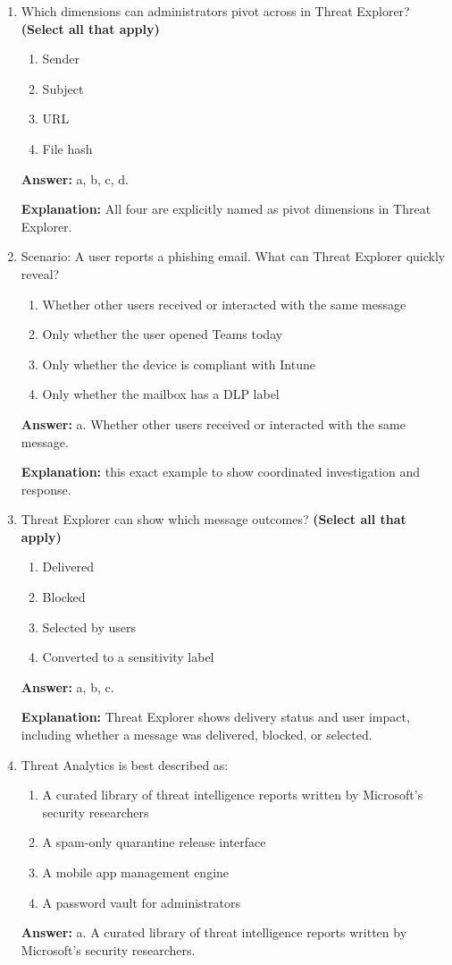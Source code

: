 \documentclass[10pt]{article}
\begin{document}
\begin{enumerate}[leftmargin=*]
\item Which dimensions can administrators pivot across in Threat Explorer? \textbf{(Select all that apply)}
\begin{enumerate}[label=\alph*., leftmargin=1.5em]
\item Sender
\item Subject
\item URL
\item File hash
\end{enumerate}
\textbf{Answer:} a, b, c, d.

\textbf{Explanation:} All four are explicitly named as pivot dimensions in Threat Explorer.

\item Scenario: A user reports a phishing email. What can Threat Explorer quickly reveal?
\begin{enumerate}[label=\alph*., leftmargin=1.5em]
\item Whether other users received or interacted with the same message
\item Only whether the user opened Teams today
\item Only whether the device is compliant with Intune
\item Only whether the mailbox has a DLP label
\end{enumerate}
\textbf{Answer:} a. Whether other users received or interacted with the same message.

\textbf{Explanation:} this exact example to show coordinated investigation and response.

\item Threat Explorer can show which message outcomes? \textbf{(Select all that apply)}
\begin{enumerate}[label=\alph*., leftmargin=1.5em]
\item Delivered
\item Blocked
\item Selected by users
\item Converted to a sensitivity label
\end{enumerate}
\textbf{Answer:} a, b, c.

\textbf{Explanation:} Threat Explorer shows delivery status and user impact, including whether a message was delivered, blocked, or selected.

\item Threat Analytics is best described as:
\begin{enumerate}[label=\alph*., leftmargin=1.5em]
\item A curated library of threat intelligence reports written by Microsoft’s security researchers
\item A spam-only quarantine release interface
\item A mobile app management engine
\item A password vault for administrators
\end{enumerate}
\textbf{Answer:} a. A curated library of threat intelligence reports written by Microsoft’s security researchers.


\end{enumerate}
\end{document}

